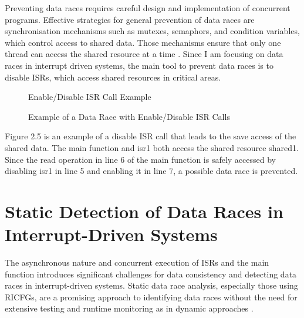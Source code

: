 \documentclass[
fancyheadings, %
%
%
]{stsreprt}
\begin{document}
{		Preventing data races requires careful design and implementation of concurrent programs. Effective strategies for general prevention of data races are synchronisation mechanisms such as mutexes, semaphors, and condition variables, which control access to shared data. Those mechanisms ensure that only one thread can access the shared resource at a time \cite{herlihy2008}. Since I am focusing on data races in interrupt driven systems, the main tool to prevent data races is to disable ISRs, which access shared resources in critical areas.
		\begin{figure}[H]
			\centering
			\begin{algorithm}[H]
				\caption{Enable/Disable ISR Call Example}
				
				
				
				
			\end{algorithm}
			\caption{Example of a Data Race with Enable/Disable ISR Calls}
		\end{figure}
		Figure 2.5 is an example of a disable ISR call that leads to the save access of the shared data. The main function and isr1 both access the shared resource shared1. Since the read operation in line 6 of the main function is safely accessed by disabling isr1 in line 5 and enabling it in line 7, a possible data race is prevented.
		\section{Static Detection of Data Races in Interrupt-Driven Systems}
		
		The asynchronous nature and concurrent execution of ISRs and the main function introduces significant challenges for data consistency and detecting data races in interrupt-driven systems. Static data race analysis, especially those using RICFGs, are a promising approach to identifying data races without the need for extensive testing and runtime monitoring as in dynamic approaches \cite{wang2020}.
		
}
\end{document}
